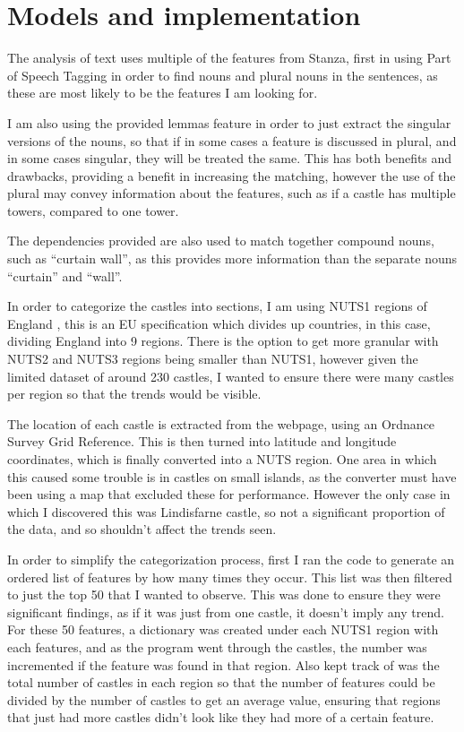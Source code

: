 \documentclass[12pt]{article}
\begin{document}
\section{Models and implementation}

The analysis of text uses multiple of the features from Stanza, first in using Part of Speech Tagging in order to find nouns and plural nouns in the sentences, as these are most likely to be the features I am looking for.

I am also using the provided lemmas feature in order to just extract the singular versions of the nouns, so that if in some cases a feature is discussed in plural, and in some cases singular, they will be treated the same. This has both benefits and drawbacks, providing a benefit in increasing the matching, however the use of the plural may convey information about the features, such as if a castle has multiple towers, compared to one tower.

The dependencies provided are also used to match together compound nouns, such as “curtain wall”, as this provides more information than the separate nouns “curtain” and “wall”.

In order to categorize the castles into sections, I am using NUTS1 regions of England \cite{nuts}, this is an EU specification which divides up countries, in this case, dividing England into 9 regions. There is the option to get more granular with NUTS2 and NUTS3 regions being smaller than NUTS1, however given the limited dataset of around 230 castles, I wanted to ensure there were many castles per region so that the trends would be visible.

The location of each castle is extracted from the webpage, using an Ordnance Survey Grid Reference. This is then turned into latitude and longitude coordinates, which is finally converted into a NUTS region. One area in which this caused some trouble is in castles on small islands, as the converter must have been using a map that excluded these for performance. However the only case in which I discovered this was Lindisfarne castle, so not a significant proportion of the data, and so shouldn't affect the trends seen.

In order to simplify the categorization process, first I ran the code to generate an ordered list of features by how many times they occur. This list was then filtered to just the top 50 that I wanted to observe. This was done to ensure they were significant findings, as if it was just from one castle, it doesn't imply any trend. For these 50 features, a dictionary was created under each NUTS1 region with each features, and as the program went through the castles, the number was incremented if the feature was found in that region. Also kept track of was the total number of castles in each region so that the number of features could be divided by the number of castles to get an average value, ensuring that regions that just had more castles didn't look like they had more of a certain feature.
\end{document}
